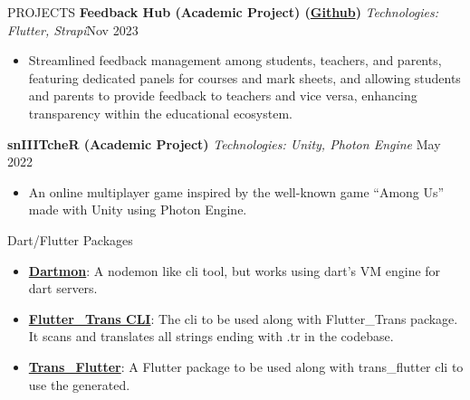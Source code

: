 \documentclass{resume} %
\begin{document}
\begin{rSection}{PROJECTS}
    \textbf{Feedback Hub (Academic Project) (\href{https://github.com/ShivanshuKGupta/feedback_hub}{Github})} \textit{Technologies: Flutter, Strapi}\hfill Nov 2023
    \begin{itemize}
        \itemsep -3pt {}
        \item Streamlined feedback management among students, teachers, and parents, featuring dedicated panels for courses and mark sheets, and allowing students and parents to provide feedback to teachers and vice versa, enhancing transparency within the educational ecosystem.
    \end{itemize}

    \textbf{snIIITcheR (Academic Project)} \textit{Technologies: Unity, Photon Engine} \hfill May 2022
    \begin{itemize}
        \itemsep -3pt {}
        \item An online multiplayer game inspired by the well-known game “Among Us” made with Unity using Photon Engine.
    \end{itemize}

\end{rSection}

\begin{rSection}{Dart/Flutter Packages}
    \begin{itemize}
        \item \textbf{\href{https://pub.dev/packages/dartmon_cli}{Dartmon}}: A nodemon like cli tool, but works using dart's VM engine for dart servers.

        \item \textbf{\href{https://pub.dev/packages/fluttertrans}{Flutter\_Trans CLI}}: The cli to be used along with Flutter\_Trans package. It scans and translates all strings ending with .tr in the codebase.

        \item \textbf{\href{https://pub.dev/packages/trans_flutter}{Trans\_Flutter}}: A Flutter package to be used along with trans\_flutter cli to use the generated.

    \end{itemize}
\end{rSection}

\end{document}
